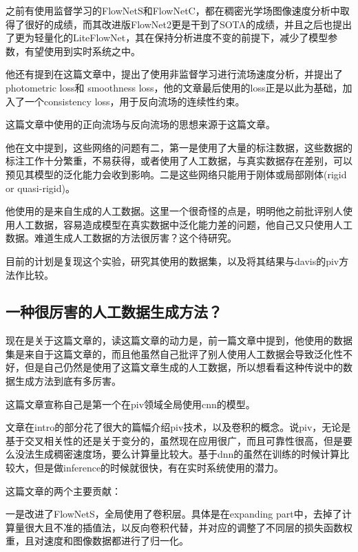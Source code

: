 \documentclass[UTF8]{ctexart}
\begin{document}
之前有使用监督学习的FlowNetS和FlowNetC\cite{fischer_flownet_2015}，都在稠密光学场图像速度分析中取得了很好的成绩，而其改进版FlowNet2\cite{meister_unflow_2017}更是干到了SOTA的成绩，并且之后也提出了更为轻量化的LiteFlowNet，其在保持分析进度不变的前提下，减少了模型参数，有望使用到实时系统之中。

他还有提到在这篇文章\cite{yu_back_2016}中，提出了使用非监督学习进行流场速度分析，并提出了photometric loss和 smoothness loss，他的文章最后使用的loss正是以此为基础，加入了一个consistency loss，用于反向流场的连续性约束。

这篇文章中使用的正向流场与反向流场的思想来源于\cite{meister_unflow_2017}这篇文章。

他在文中提到，这些网络的问题有二，第一是使用了大量的标注数据，这些数据的标注工作十分繁重，不易获得，或者使用了人工数据，与真实数据存在差别，可以预见其模型的泛化能力会收到影响。二是这些网络只能用于刚体或局部刚体(rigid or quasi-rigid)。

他使用的是来自\cite{cai_flow_2021}生成的人工数据。这里一个很奇怪的点是，明明他之前批评别人使用人工数据，容易造成模型在真实数据中泛化能力差的问题，他自己又只使用人工数据。难道\cite{cai_flow_2021}生成人工数据的方法很厉害？这个待研究。

目前的计划是复现这个实验，研究其使用的数据集，以及将其结果与davis的piv方法作比较。


\subsection{一种很厉害的人工数据生成方法？}

现在是关于这篇文章\cite{cai_dense_2019}的，读这篇文章的动力是，前一篇文章中提到，他使用的数据集是来自于这篇文章的，而且他虽然自己批评了别人使用人工数据会导致泛化性不好，但是自己仍然是使用了这篇文章生成的人工数据，所以想看看这种传说中的数据生成方法到底有多厉害。

这篇文章宣称自己是第一个在piv领域全局使用cnn的模型。

文章在intro的部分花了很大的篇幅介绍piv技术，以及卷积的概念。说piv，无论是基于交叉相关性的还是关于变分的，虽然现在应用很广，而且可靠性很高，但是要么没法生成稠密速度场，要么计算量比较大。基于dnn的虽然在训练的时候计算比较大，但是做inference的时候就很快，有在实时系统使用的潜力。

这篇文章的两个主要贡献：

一是改进了FlowNetS，全局使用了卷积层。具体是在expanding part中，去掉了计算量很大且不准的插值法，以反向卷积代替，并对应的调整了不同层的损失函数权重，且对速度和图像数据都进行了归一化。
\end{document}
